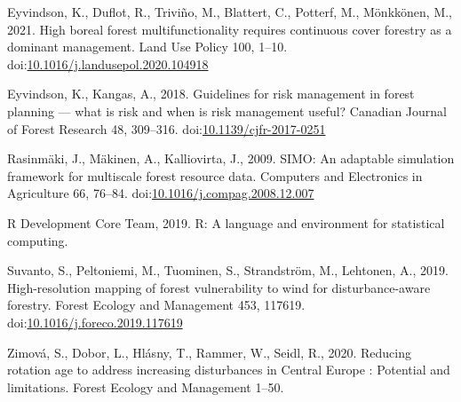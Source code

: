 \documentclass[]{elsarticle} %
\begin{document}
\leavevmode\hypertarget{ref-Eyvindson2020}{}%
Eyvindson, K., Duflot, R., Triviño, M., Blattert, C., Potterf, M.,
Mönkkönen, M., 2021. High boreal forest multifunctionality requires
continuous cover forestry as a dominant management. Land Use Policy 100,
1--10.
doi:\href{https://doi.org/10.1016/j.landusepol.2020.104918}{10.1016/j.landusepol.2020.104918}

\leavevmode\hypertarget{ref-Eyvindson2018}{}%
Eyvindson, K., Kangas, A., 2018. Guidelines for risk management in
forest planning --- what is risk and when is risk management useful?
Canadian Journal of Forest Research 48, 309--316.
doi:\href{https://doi.org/10.1139/cjfr-2017-0251}{10.1139/cjfr-2017-0251}

\leavevmode\hypertarget{ref-Rasinmaki2009}{}%
Rasinmäki, J., Mäkinen, A., Kalliovirta, J., 2009. SIMO: An adaptable
simulation framework for multiscale forest resource data. Computers and
Electronics in Agriculture 66, 76--84.
doi:\href{https://doi.org/10.1016/j.compag.2008.12.007}{10.1016/j.compag.2008.12.007}

\leavevmode\hypertarget{ref-RDevelopmentCoreTeam2019}{}%
R Development Core Team, 2019. R: A language and environment for
statistical computing.

\leavevmode\hypertarget{ref-Suvanto2019}{}%
Suvanto, S., Peltoniemi, M., Tuominen, S., Strandström, M., Lehtonen,
A., 2019. High-resolution mapping of forest vulnerability to wind for
disturbance-aware forestry. Forest Ecology and Management 453, 117619.
doi:\href{https://doi.org/10.1016/j.foreco.2019.117619}{10.1016/j.foreco.2019.117619}

\leavevmode\hypertarget{ref-Zimova2020}{}%
Zimová, S., Dobor, L., Hlásny, T., Rammer, W., Seidl, R., 2020. Reducing
rotation age to address increasing disturbances in Central Europe :
Potential and limitations. Forest Ecology and Management 1--50.
\end{document}

